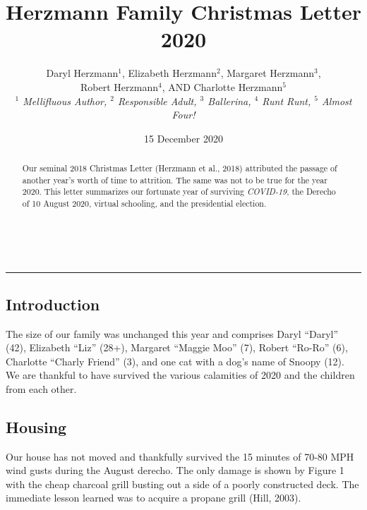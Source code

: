 \documentclass[letterpaper,11pt]{article}
\title{\vspace{-2.0cm}Herzmann Family Christmas Letter 2020}
\author{Daryl Herzmann${}^1$, Elizabeth Herzmann${}^2$, Margaret 
Herzmann${}^3$,\\
Robert Herzmann${}^4$, AND Charlotte Herzmann${}^5$ \\
\it{${}^1$ Mellifluous Author},
\it{${}^2$ Responsible Adult},
\it{${}^3$ Ballerina},
\it{${}^4$ Runt Runt},
\it{${}^5$ Almost Four!}}
\date{15 December 2020}
\newcommand{\Line}[0]{%
  \rule{0cm}{0cm}\\\hrule\rule{0cm}{0cm}%
}
\begin{document}
\maketitle
\vspace{-0.75cm}
\begin{abstract}
Our seminal 2018 Christmas Letter (Herzmann et al., 2018) attributed the passage
of another year's worth of time to attrition.  The same was not to be true for the
year 2020.  This letter summarizes our fortunate year of surviving \textit{COVID-19},
the Derecho of 10 August 2020, virtual schooling, and the presidential election.
\end{abstract}

\vspace{-0.5cm}
\Line

\begin{multicols}{2}

\section{Introduction} 

The size of our family was unchanged this year and comprises Daryl
\enquote{Daryl} (42), Elizabeth \enquote{Liz} (28+),
Margaret \enquote{Maggie Moo} (7), Robert \enquote{Ro-Ro} (6), Charlotte
 \enquote{Charly Friend} (3), and one cat with a dog's name of Snoopy (12). 
We are thankful to have survived the various calamities of 2020 and the
children from each other.
   
\subsection{Housing}

Our house has not moved and thankfully survived the 15 minutes of 70-80 MPH
wind gusts during the August derecho.  The only damage is shown by Figure 1 with
the cheap charcoal grill busting out a side of a poorly constructed deck.
The immediate lesson learned was to acquire a propane grill (Hill, 2003).

\bigskip


\end{multicols}
\end{document}
